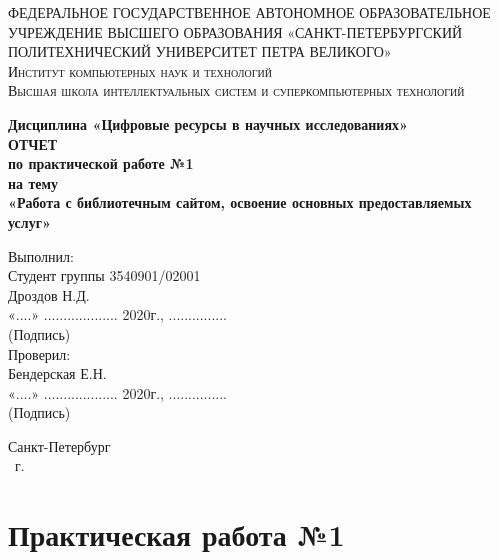 \documentclass[14pt,a4paper,report]{report}
\begin{document}
\def\contentsname{Содержание}

\begin{titlepage}
	\begin{center}
		\textsc{ФЕДЕРАЛЬНОЕ ГОСУДАРСТВЕННОЕ АВТОНОМНОЕ ОБРАЗОВАТЕЛЬНОЕ УЧРЕЖДЕНИЕ ВЫСШЕГО ОБРАЗОВАНИЯ
«САНКТ-ПЕТЕРБУРГСКИЙ ПОЛИТЕХНИЧЕСКИЙ УНИВЕРСИТЕТ ПЕТРА ВЕЛИКОГО»\\[5mm]
			Институт компьютерных наук и технологий\\
			Высшая школа интеллектуальных систем и суперкомпьютерных технологий}
		
		\vfill
		
		\textbf{Дисциплина «Цифровые ресурсы в научных исследованиях»\\[10mm]
		ОТЧЕТ\\[2mm]
		по практической работе №1\\[2mm]
		на тему\\[2mm]
			«Работа с библиотечным сайтом, освоение основных предоставляемых услуг»\\[41mm]
		}
	\end{center}
	
	\hfill
	\begin{minipage}{.4\textwidth}
		Выполнил:\\[2mm] 
        Студент группы 3540901/02001\\
		Дроздов Н.Д.\\[2mm]
        «....» ................... 2020г., ...............\\
        \hspace*{38mm} (Подпись)\\[2mm]
		Проверил:\\[2mm] 
		Бендерская Е.Н.\\[2mm]
		«....» ................... 2020г., ...............\\
        \hspace*{38mm} (Подпись)\\
	\end{minipage}
	\vfill
	\begin{center}
		Санкт-Петербург\\ \the\year\ г.
	\end{center}
\end{titlepage}

\tableofcontents
\clearpage

\chapter{Практическая работа №1}
\end{document}
